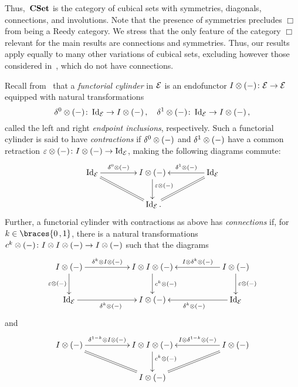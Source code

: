 \documentclass[reqno,10pt,a4paper,oneside,draft]{amsart}
\begin{document}
Thus,~$\mathbf{CSet}$ is the category of cubical sets with symmetries, diagonals, connections, and involutions.
Note that the presence of symmetries precludes $\Box$ from being a Reedy category.
We stress that the only feature of the category $\Box$ relevant for the main results are connections and symmetries.
Thus, our results apply equally to many other variations of cubical sets, excluding however those considered in~\cite{coquand-cubical-sets,huber-thesis}, which do not have connections.

Recall from~\cite{kamps-porter:homotopy} that a \emph{functorial cylinder} in $\mathcal{E}$ is an endofunctor $I \otimes (-) \colon \mathcal{E} \to \mathcal{E}$ equipped with natural transformations
\[
\delta^0 \otimes (-) \colon \operatorname{Id}_{\mathcal{E}} \to I \otimes (-)
\, , \quad
\delta^1 \otimes (-) \colon \operatorname{Id}_{\mathcal{E}} \to I \otimes (-)
\, ,\]
called the left and right \emph{endpoint inclusions}, respectively.
Such a functorial cylinder is said to have \emph{contractions} if $\delta^0 \otimes (-)$ and $\delta^1 \otimes (-)$ have a common retraction $\varepsilon \otimes (-) \colon I \otimes (-) \to \operatorname{Id}_{\mathcal{E}}$, making the following diagrams commute:
\[
\xymatrix@C+2em{
  \Id_\catE
  \ar[r]^-{\lcyl \otimes (-)}
  \ar@{=}[dr]
&
  \interval \otimes (-)
  \ar[d]^(0.4){\ccyl \otimes (-)}
&
  \Id_\catE
  \ar[l]_-{\rcyl \otimes (-)}
  \ar@{=}[dl]
\\&
  \Id_\catE
\rlap{.}}
\]
Further, a functorial cylinder with contractions as above has \emph{connections} if, for $k \in \braces{0\,, 1}$, there is a natural transformations $c^k \otimes (-) \colon I \otimes I \otimes (-) \to I \otimes (-)$ such that the diagrams
\begin{equation} \label{connections:0}
\begin{gathered}
\xymatrix@C+3em{
  \interval \otimes (-)
  \ar[r]^-{\kcyl \otimes \interval \otimes (-)}
  \ar[d]_{\ccyl \otimes (-)}
&
  \interval \otimes \interval \otimes (-)
  \ar[d]^{c^k \otimes (-)}
&
  \interval \otimes (-)
  \ar[l]_-{\interval \otimes \kcyl \otimes (-)}
  \ar[d]^{\ccyl \otimes (-)}
\\
  \Id_\catE
  \ar[r]_{\kcyl \otimes (-)}
&
  \interval \otimes (-)
&
  \Id_\catE
  \ar[l]^{\kcyl \otimes (-)}
}
\end{gathered}
\end{equation}
and
\begin{equation} \label{connections:1}
\begin{gathered}
\xymatrix@C+3em{
  \interval \otimes (-)
  \ar[r]^-{\kcylinv \otimes \interval \otimes (-)}
  \ar@{=}[dr]
&
  \interval \otimes \interval \otimes (-)
  \ar[d]^(0.4){c^k \otimes (-)}
&
  \interval \otimes (-)
  \ar[l]_-{\interval \otimes \kcylinv \otimes (-)}
  \ar@{=}[dl]
\\&
  \interval \otimes (-)
}
\end{gathered}
\end{equation}
\end{document}
